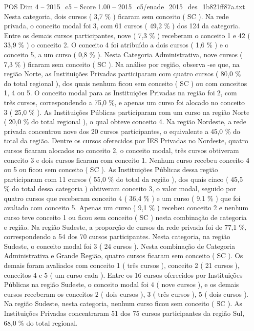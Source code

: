 \begin{textsample}{POS Dim 4 – 2015\_c5 – Score 1.00 – 2015\_c5/enade\_2015\_des\_1b821ff87a.txt}
Nesta categoria, dois cursos ( 3,7 \% ) ficaram sem conceito ( SC ).
Na rede privada, o conceito modal foi 3, com 61 cursos ( 49,2 \% ) dos 124 da categoria.
Entre os demais cursos participantes, nove ( 7,3 \% ) receberam o conceito 1 e 42 ( 33,9 \% ) o conceito 2.
O conceito 4 foi atribuído a dois cursos ( 1,6 \% ) e o conceito 5, a um curso ( 0,8 \% ).
Nesta Categoria Administrativa, nove cursos ( 7,3 \% ) ficaram sem conceito ( SC ).
Na análise por região, observa -se que, na região Norte, as Instituições Privadas participaram com quatro cursos ( 80,0 \% do total regional ), dos quais nenhum ficou sem conceito ( SC ) ou com conceitos 1, 4 ou 5.
O conceito modal para as Instituições Privadas na região foi 2, com três cursos, correspondendo a 75,0 \%, e apenas um curso foi alocado no conceito 3 ( 25,0 \% ).
As Instituições Públicas participaram com um curso na região Norte ( 20,0 \% do total regional ), o qual obteve conceito 4.
Na região Nordeste, a rede privada concentrou nove dos 20 cursos participantes, o equivalente a 45,0 \% do total da região.
Dentre os cursos oferecidos por IES Privadas no Nordeste, quatro cursos ficaram alocados no conceito 2, o conceito modal, três cursos obtiveram conceito 3 e dois cursos ficaram com conceito 1.
Nenhum curso recebeu conceito 4 ou 5 ou ficou sem conceito ( SC ).
As Instituições Públicas dessa região participaram com 11 cursos ( 55,0 \% do total da região ), dos quais cinco ( 45,5 \% do total dessa categoria ) obtiveram conceito 3, o valor modal, seguido por quatro cursos que receberam conceito 4 ( 36,4 \% ) e um curso ( 9,1 \% ) que foi avaliado com conceito 5.
Apenas um curso ( 9,1 \% ) recebeu conceito 2 e nenhum curso teve conceito 1 ou ficou sem conceito ( SC ) nesta combinação de categoria e região.
Na região Sudeste, a proporção de cursos da rede privada foi de 77,1 \%, correspondendo a 54 dos 70 cursos participantes.
Nesta categoria, na região Sudeste, o conceito modal foi 3 ( 24 cursos ).
Nesta combinação de Categoria Administrativa e Grande Região, quatro cursos ficaram sem conceito ( SC ).
Os demais foram avaliados com conceito 1 ( três cursos ), conceito 2 ( 21 cursos ), conceitos 4 e 5 ( um curso cada ).
Entre os 16 cursos oferecidos por Instituições Públicas na região Sudeste, o conceito modal foi 4 ( nove cursos ), e os demais cursos receberam os conceitos 2 ( dois cursos ), 3 ( três cursos ), 5 ( dois cursos ).
Na região Sudeste, nesta categoria, nenhum curso ficou sem conceito ( SC ).
As Instituições Privadas concentraram 51 dos 75 cursos participantes da região Sul, 68,0 \% do total regional.

\end{textsample}

